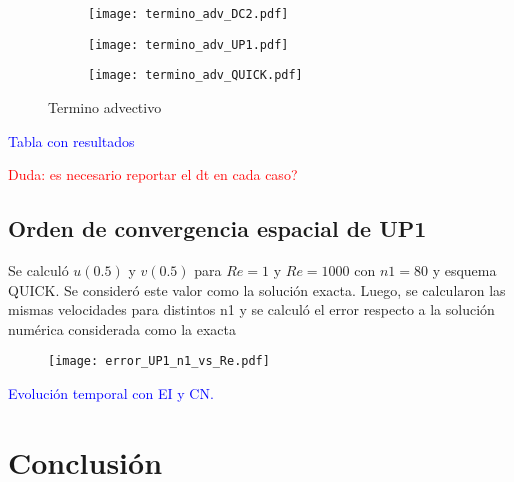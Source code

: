 \documentclass[aps,prb,twocolumn,superscriptaddress,floatfix,longbibliography,10pt]{revtex4-2}
\newcounter{para}
\begin{document}
\begin{figure}
  \centering
  \begin{subfigure}[b]{0.3\textwidth}
      \centering
      \texttt{[image: termino\_adv\_DC2.pdf]}
      \caption{}
      \label{fig:termino_adv_DC2}
  \end{subfigure}
  \hfill
  \begin{subfigure}[b]{0.3\textwidth}
      \centering
      \texttt{[image: termino\_adv\_UP1.pdf]}
      \caption{}
      \label{fig:termino_adv_UP1}
  \end{subfigure}
  \hfill
  \begin{subfigure}[b]{0.3\textwidth}
      \centering
      \texttt{[image: termino\_adv\_QUICK.pdf]}
      \caption{}
      \label{fig:termino_adv_QUICK}
  \end{subfigure}
     \caption{Termino advectivo}
     \label{fig:termino_advectivo}
\end{figure}

\textcolor{blue}{Tabla con resultados}

\textcolor{red}{Duda: es necesario reportar el dt en cada caso?}

\subsection{Orden de convergencia espacial de UP1}

Se calculó $u(0.5)$ y $v(0.5)$ para $Re = 1$ y $Re = 1000$ con $n1 = 80$ y esquema QUICK. Se consideró este valor como la solución exacta. Luego, se calcularon las mismas velocidades para distintos n1 y se calculó el error respecto a la solución numérica considerada como la exacta

\begin{figure}[h]
  \texttt{[image: error\_UP1\_n1\_vs\_Re.pdf]}
  \caption{}
   \label{fig:error_UP1_n1_vs_Re}
\end{figure}


\textcolor{blue}{Evolución temporal con EI y CN.}





\section{Conclusión}


\end{document}
